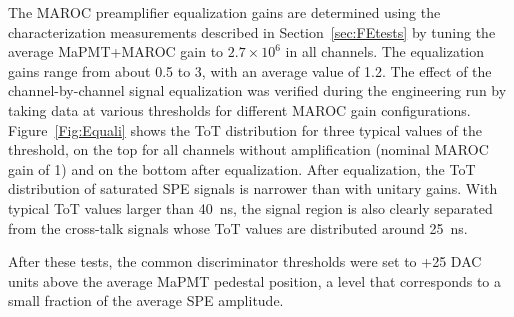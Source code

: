 \documentclass[5p,times,twocolumn]{elsarticle}
\begin{document}
The MAROC preamplifier equalization gains are determined using the characterization measurements described in
Section~\ref{sec:FEtests} by tuning the average MaPMT+MAROC gain to $2.7 \times 10^6$ in all channels. The
equalization gains range from about 0.5 to 3, with an average value of 1.2. The effect of the channel-by-channel signal
equalization was verified during the engineering run by taking data at various thresholds for different MAROC gain
configurations.  Figure~\ref{Fig:Equali} shows the ToT distribution for three typical values of the threshold, on the top
for all channels without amplification (nominal MAROC gain of 1) and on the bottom after equalization. After equalization,
the ToT distribution of saturated SPE signals is narrower than with unitary gains.  With typical ToT values larger than
40~ns, the signal region is also clearly separated from the cross-talk signals whose ToT values are distributed around
25~ns.

After these tests, the common discriminator thresholds were set to +25 DAC units above the average MaPMT
pedestal position, a level that corresponds to a small fraction of the average SPE amplitude.
\end{document}
